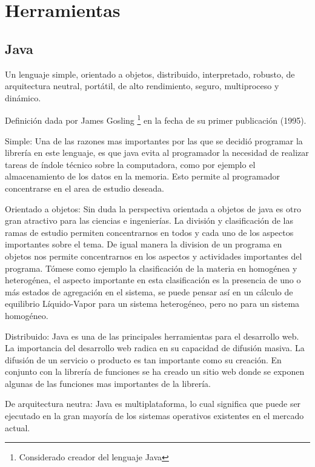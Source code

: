 \chapter{Herramientas}
	\section{Java}
		Un lenguaje simple, orientado a objetos, distribuido, interpretado, robusto, de arquitectura neutral, portátil, de alto rendimiento, seguro, multiproceso y dinámico.\cite{java} 

		Definición dada por James Gosling \footnote{Considerado creador del lenguaje Java}  en la fecha de su primer publicación (1995). 

		\begin{description}
		\item{Simple:} Una de las razones mas importantes por las que se decidió programar la librería en este lenguaje, es que java evita al programador la necesidad de realizar tareas de índole técnico sobre la computadora, como por ejemplo el almacenamiento de los datos en la memoria. Esto permite al programador concentrarse en el area de estudio deseada.

		\item{Orientado a objetos:}
		Sin duda la perspectiva orientada a objetos de java es otro gran atractivo para las ciencias e ingenierías. La división y clasificación de las ramas de estudio permiten concentrarnos en todos y cada uno de los aspectos importantes sobre el tema. De igual manera la division de un programa en objetos nos permite concentrarnos en los aspectos y actividades importantes del programa. Tómese como ejemplo la clasificación de la materia en homogénea y heterogénea, el aspecto importante en esta clasificación es la presencia de uno o más estados de agregación en el sistema, se puede pensar así en un cálculo de equilibrio Líquido-Vapor para un sistema heterogéneo, pero no para un sistema homogéneo.

		\item{Distribuido:}
		Java es una de las principales herramientas para el desarrollo web. La importancia del desarrollo web radica en su capacidad de difusión masiva. La difusión de un servicio o producto es tan importante como su creación. En conjunto con la librería de funciones se ha creado un sitio web donde se exponen algunas de las funciones mas importantes de la librería.

		\item{De arquitectura neutra:}
		Java es multiplataforma, lo cual significa que puede ser ejecutado en la gran mayoría de los sistemas operativos existentes en el mercado actual.

		\end{description}

